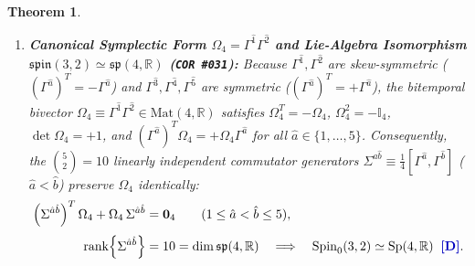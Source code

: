 \documentclass[11pt,a4paper]{article}
\newcommand{\catD}{\text{\textbf{\textcolor{blue!75!black}{[D]}}}}
\theoremstyle{definition}
\theoremstyle{plain}
\newtheorem{theorem}[axiom]{Theorem}
\theoremstyle{remark}
\begin{document}
\begin{theorem}
\begin{enumerate}[label=(\roman*)]
\begin{align}
  \end{align}
  generate the real Clifford algebra $\mathrm{Cl}(3,2)$, with central volume element $\Gamma_{\mathrm{vol}} \equiv -\Gamma^{\hat{1}}\Gamma^{\hat{2}}\Gamma^{\hat{3}}\Gamma^{\hat{4}}\Gamma^{\hat{5}} = +\mathbb{I}_4$ satisfying:
  \begin{align}
  \Gamma_{\mathrm{vol}}^2 &= +\mathbb{I}_4, \qquad
  \left[\Gamma_{\mathrm{vol}}, \Gamma^{\hat{a}}\right] = \mathbf{0}_4 \quad (\forall\,\hat{a}) \nonumber \\[3pt]
  \Longrightarrow \quad \mathrm{Cl}(3,2) &\simeq \mathrm{Mat}(4, \mathbb{R})_+ \oplus \mathrm{Mat}(4, \mathbb{R})_- \;\;\catD. \label{eq:c6_central_volume_element}
  \end{align}

  \item \textbf{Canonical Symplectic Form $\Omega_4 = \Gamma^{\hat{1}}\Gamma^{\hat{2}}$ and Lie-Algebra Isomorphism $\mathfrak{spin}(3,2) \simeq \mathfrak{sp}(4, \mathbb{R})$ (\texttt{COR~\#031}):}
  Because $\Gamma^{\hat{1}}, \Gamma^{\hat{2}}$ are skew-symmetric ($(\Gamma^{\hat{a}})^T = -\Gamma^{\hat{a}}$) and $\Gamma^{\hat{3}}, \Gamma^{\hat{4}}, \Gamma^{\hat{5}}$ are symmetric ($(\Gamma^{\hat{a}})^T = +\Gamma^{\hat{a}}$), the bitemporal bivector $\Omega_4 \equiv \Gamma^{\hat{1}}\Gamma^{\hat{2}} \in \mathrm{Mat}(4,\mathbb{R})$ satisfies $\Omega_4^T = -\Omega_4$, $\Omega_4^2 = -\mathbb{I}_4$, $\det\Omega_4 = +1$, and $(\Gamma^{\hat{a}})^T\Omega_4 = +\Omega_4\Gamma^{\hat{a}}$ for all $\hat{a} \in \{1,\dots,5\}$. Consequently, the $\binom{5}{2} = 10$ linearly independent commutator generators $\Sigma^{\hat{a}\hat{b}} \equiv \frac{1}{4}[\Gamma^{\hat{a}}, \Gamma^{\hat{b}}]$ ($\hat{a} < \hat{b}$) preserve $\Omega_4$ identically:
  \begin{align}
  \left(\Sigma^{\hat{a}\hat{b}}\right)^T \Omega_4 + \Omega_4\,\Sigma^{\hat{a}\hat{b}} &= \mathbf{0}_4 \qquad (1 \le \hat{a} < \hat{b} \le 5), \nonumber \\[3pt]
  \mathrm{rank}\!\left\{\Sigma^{\hat{a}\hat{b}}\right\} &= 10 = \dim\mathfrak{sp}(4, \mathbb{R}) \quad \Longrightarrow \quad
  \mathrm{Spin}_0(3,2) \simeq \mathrm{Sp}(4, \mathbb{R}) \;\;\catD. \label{eq:c6_sp4_isomorphism}
  \end{align}


\end{enumerate}
\end{theorem}
\end{document}
